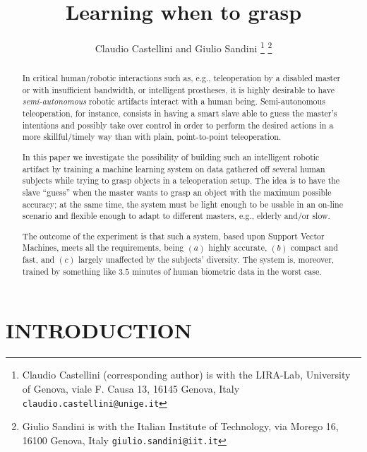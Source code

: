 \documentclass[a4paper,10pt,conference]{ieeeconf}
\title{\LARGE \bf Learning when to grasp}
\author{Claudio Castellini and Giulio Sandini%
\thanks{Claudio Castellini (corresponding author) is
with the LIRA-Lab, University of Genova,
viale F. Causa 13, 16145 Genova, Italy
{\tt\small claudio.castellini@unige.it}}%
\thanks{Giulio Sandini is with the Italian Institute of Technology,
via Morego 16, 16100 Genova, Italy
{\tt\small giulio.sandini@iit.it}}%
}
\begin{document}
\maketitle
\thispagestyle{empty}
\pagestyle{empty}

\begin{abstract}

In critical human/robotic interactions such as, e.g., teleoperation by
a disabled master or with insufficient bandwidth, or intelligent
prostheses, it is highly desirable to have \emph{semi-autonomous}
robotic artifacts interact with a human being. Semi-autonomous
teleoperation, for instance, consists in having a smart slave able to
guess the master's intentions and possibly take over control in order
to perform the desired actions in a more skillful/timely way than with
plain, point-to-point teleoperation.

In this paper we investigate the possibility of building such an
intelligent robotic artifact by training a machine learning system on
data gathered off several human subjects while trying to grasp objects
in a teleoperation setup. The idea is to have the slave ``guess'' when
the master wants to grasp an object with the maximum possible
accuracy; at the same time, the system must be light enough to be
usable in an on-line scenario and flexible enough to adapt to
different masters, e.g., elderly and/or slow.

The outcome of the experiment is that such a system, based upon
Support Vector Machines, meets all the requirements, being $(a)$
highly accurate, $(b)$ compact and fast, and $(c)$ largely unaffected
by the subjects' diversity. The system is, moreover, trained by
something like $3.5$ minutes of human biometric data in the worst
case.

\end{abstract}

\section{INTRODUCTION}
\end{document}

